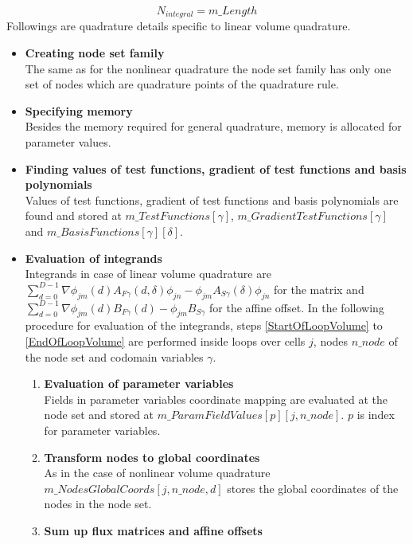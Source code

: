 \documentclass[BoSSSForSolvingConservationLaws.tex]{subfiles}
\begin{document}
\[
N_{integral}=m\_Length
\]
Followings are quadrature details specific to linear volume quadrature.
\begin{itemize}
\item \textbf{Creating node set family}\\
The same as for the nonlinear quadrature the node set family has only one set of nodes which are quadrature points of the quadrature rule.
\item \textbf{Specifying memory}\\
Besides the memory required for general quadrature, memory is allocated for parameter values.
\item \textbf{Finding values of test functions, gradient of test functions and basis polynomials}\\
Values of test functions, gradient of test functions and basis polynomials are found and stored at $m\_TestFunctions[\gamma]$, $m\_GradientTestFunctions[\gamma]$ and $m\_BasisFunctions[\gamma][\delta]$.
\item \textbf{Evaluation of integrands}\\
Integrands in case of linear volume quadrature are $\sum_{d=0}^{D-1} \nabla \phi_{jm}(d) A_{F\gamma}(d,\delta) \phi_{jn}-\phi_{jm}A_{S\gamma}(\delta)\phi_{jn}$ for the matrix and $\sum_{d=0}^{D-1}\nabla \phi_{jm}(d) B_{F\gamma}(d)-\phi_{jm}B_{S\gamma}$ for the affine offset. In the following procedure for evaluation of the integrands, steps \ref{StartOfLoopVolume} to \ref{EndOfLoopVolume} are performed inside loops over cells $j$, nodes $n\_node$ of the node set and codomain variables $\gamma$.
\begin{enumerate}
\item \textbf{Evaluation of parameter variables}\\
Fields in parameter variables coordinate mapping are evaluated at the node set and stored at $m\_ParamFieldValues[p][j,n\_node]$. $p$ is index for parameter variables.
\item \textbf{Transform nodes to global coordinates}\\
As in the case of nonlinear volume quadrature $m\_NodesGlobalCoords[j,n\_node,d]$ stores the global coordinates of the nodes in the node set.
\item \textbf{Sum up flux matrices and affine offsets}\\
\label{StartOfLoopVolume}

\end{enumerate}
\end{itemize}
\end{document}
